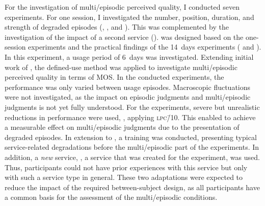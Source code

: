 For the investigation of multi\-/episodic perceived quality, I conducted seven experiments.
For one session, I investigated the number, position, duration, and strength of degraded episodes (, \EIIa{}, and ).
This was complemented by the investigation of the impact of a second service (\EIIb{}).
 was designed based on the one-session experiments and the practical findings of the 14~days experiments ( and ).
In this experiment, a usage period of 6~days was investigated.
Extending initial work of \citet{moller_single-call_2011}, the defined-use method was applied to investigate multi\-/episodic perceived quality in terms of \ac{MOS}.
In the conducted experiments, the performance was only varied between usage episodes.
Macroscopic fluctuations were not investigated, as the impact on episodic judgments and multi\-/episodic judgments is not yet fully understood.
For the experiments, severe but unrealistic reductions in performance were used, \ie, applying \textsc{\lowercase{LPC\=/10}}.
This enabled to achieve a measurable effect on multi\-/episodic judgments due to the presentation of degraded episodes.
In extension to \citet{moller_single-call_2011}, a training was conducted, presenting typical service-related degradations before the multi\-/episodic part of the experiments.
In addition, a \emph{new} service, \ie, a service that was created for the experiment, was used.
Thus, participants could not have prior experiences with this service but only with such a service type in general.
These two adaptations were expected to reduce the impact of the required between-subject design, as all participants have a common basis for the assessment of the multi\-/episodic conditions.

